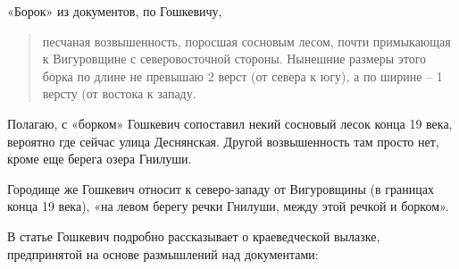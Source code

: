 
«Борок» из документов, по Гошкевичу, 

\begin{quotation}
песчаная возвышенность, поросшая сосновым лесом, почти примыкающая к Вигуровщине с северовосточной стороны. Нынешние размеры этого борка по длине не превышаю 2 верст (от севера к югу), а по ширине – 1 версту (от востока к западу.
\end{quotation}

Полагаю, с «борком» Гошкевич сопоставил некий сосновый лесок конца 19 века, вероятно где сейчас улица Деснянская. Другой возвышенность там просто нет, кроме еще берега озера Гнилуши.

Городище же Гошкевич относит к северо-западу от Вигуровщины (в границах конца 19 века), «на левом берегу речки Гнилуши, между этой речкой и борком».


В статье Гошкевич подробно рассказывает о краеведческой вылазке, предпринятой на основе размышлений над документами:

